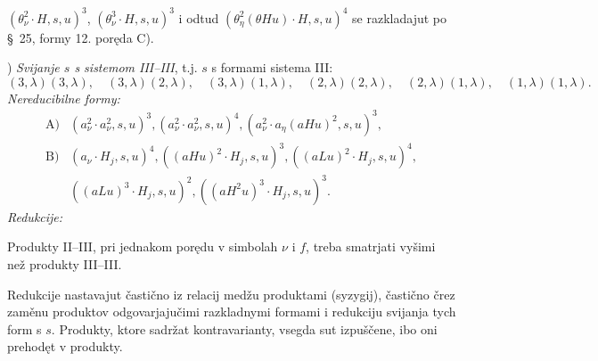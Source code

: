 \documentclass[11pt]{article}
\begin{document}
$(\theta_\nu^2\cdot H,s,u)^3$, $(\theta_\nu^3\cdot H,s,u)^3$ i odtud $(\theta_\eta^2(\theta Hu)\cdot H,s,u)^4$ se razkladajut po \S\ 25, formy 12. poręda \mbox{C)}.

) \textit{Svijanje $s$ s sistemom III--III}, t.j. $s$ s formami sistema III:
\[
(3,\lambda)(3,\lambda),\quad (3,\lambda)(2,\lambda),\quad (3,\lambda)(1,\lambda),\quad
(2,\lambda)(2,\lambda),\quad (2,\lambda)(1,\lambda),\quad
(1,\lambda)(1,\lambda).
\]
\noindent\textit{Nereducibilne formy:}
\[
\begin{array}{rl}
\mbox{A)}&(a_\nu^2\cdot a_\nu^2,s,u)^3,
(a_\nu^2\cdot a_\nu^2,s,u)^4,
(a_\nu^2\cdot a_\eta(aHu)^2,s,u)^3,\\[0.45em]
\mbox{B)}&(a_\nu\cdot H_j,s,u)^4,
((aHu)^2\cdot H_j,s,u)^3,
((aLu)^2\cdot H_j,s,u)^4,\\[0.25em]
&((aLu)^3\cdot H_j,s,u)^2,
((aH^2u)^3\cdot H_j,s,u)^3.
\end{array}
\]
\noindent\textit{Redukcije:}

Produkty II--III, pri jednakom porędu v simbolah $\nu$ i $f$, treba smatrjati vyšimi než produkty III--III.

Redukcije nastavajut častično iz relacij medžu produktami (syzygij), častično črez zaměnu produktov odgovarjajučimi razkladnymi formami i redukciju svijanja tych form s $s$. Produkty, ktore sadržat kontravarianty, vsegda sut izpuščene, ibo oni prehodęt v produkty.
\end{document}
